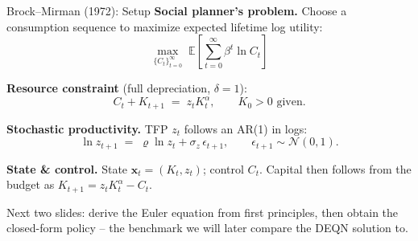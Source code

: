 \documentclass[aspectratio=169,11pt]{beamer}
\newcommand{\emphc}[1]{\textcolor{harvardcrimson}{#1}}
\newcommand{\E}[1]{\mathbb{E}\!\left[#1\right]}
\begin{document}
\begin{frame}{Brock--Mirman (1972): Setup}
\footnotesize
\textbf{Social planner's problem.} Choose a consumption sequence to maximize expected lifetime log utility:
\[
\max_{\{C_t\}_{t=0}^{\infty}} \; \E{\sum_{t=0}^{\infty} \beta^t \ln C_t}
\]

\vspace{0.2em}
\textbf{Resource constraint} (full depreciation, $\delta = 1$):
\[
C_t + K_{t+1} \;=\; z_t K_t^{\alpha}, \qquad K_0 > 0 \text{ given.}
\]

\vspace{0.2em}
\textbf{Stochastic productivity.} TFP $z_t$ follows an AR(1) in logs:
\[
\ln z_{t+1} \;=\; \varrho \ln z_t + \sigma_z\, \epsilon_{t+1}, \qquad \epsilon_{t+1} \sim \mathcal{N}(0,1).
\]

\vspace{0.2em}
\textbf{State \& control.} State $\bm{x}_t = (K_t, z_t)$; control $C_t$. Capital then follows from the budget as $K_{t+1} = z_t K_t^\alpha - C_t$.

\vspace{0.4em}
{\footnotesize\emphc{Next two slides:} derive the Euler equation from first principles, then obtain the closed-form policy -- the benchmark we will later compare the DEQN solution to.}
\end{frame}
\end{document}
